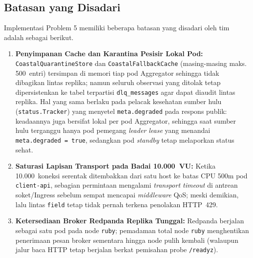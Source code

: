 \vspace{1em}

\subsection{Batasan yang Disadari}
Implementasi Problem 5 memiliki beberapa batasan yang disadari oleh tim adalah sebagai berikut.
\begin{enumerate}
    \item \textbf{Penyimpanan Cache dan Karantina Pesisir Lokal Pod:} \texttt{CoastalQuarantineStore} dan \texttt{CoastalFallbackCache} (masing-masing maks. 500~entri) tersimpan di memori tiap pod Aggregator sehingga tidak dibagikan lintas replika; namun seluruh observasi yang ditolak tetap dipersistenkan ke tabel terpartisi \texttt{dlq\_messages} agar dapat diaudit lintas replika. Hal yang sama berlaku pada pelacak kesehatan sumber hulu (\texttt{status.Tracker}) yang menyetel \texttt{meta.degraded} pada respons publik: keadaannya juga bersifat lokal per pod Aggregator, sehingga saat sumber hulu terganggu hanya pod pemegang \textit{leader lease} yang menandai \texttt{meta.degraded = true}, sedangkan pod \textit{standby} tetap melaporkan status sehat.
    \item \textbf{Saturasi Lapisan Transport pada Badai 10.000~VU:} Ketika 10.000~koneksi serentak ditembakkan dari satu host ke batas CPU 500m pod \texttt{client-api}, sebagian permintaan mengalami \textit{transport timeout} di antrean soket/Ingress sebelum sempat mencapai \textit{middleware} QoS; meski demikian, lalu lintas \texttt{field} tetap tidak pernah terkena penolakan HTTP~429.
    \item \textbf{Ketersediaan Broker Redpanda Replika Tunggal:} Redpanda berjalan sebagai satu pod pada node \texttt{ruby}; pemadaman total node \texttt{ruby} menghentikan penerimaan pesan broker sementara hingga node pulih kembali (walaupun jalur baca HTTP tetap berjalan berkat pemisahan probe \texttt{/readyz}).
\end{enumerate}

\vspace{1em}

